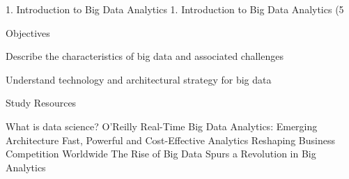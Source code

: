 1. Introduction to Big Data Analytics
1. Introduction to Big Data Analytics (5%

Objectives

Describe the characteristics of big data and associated challenges

Understand technology and architectural strategy for big data

Study Resources

What is data science? O’Reilly
Real-Time Big Data Analytics: Emerging Architecture
Fast, Powerful and Cost-Effective Analytics Reshaping Business Competition Worldwide
The Rise of Big Data Spurs a Revolution in Big Analytics

